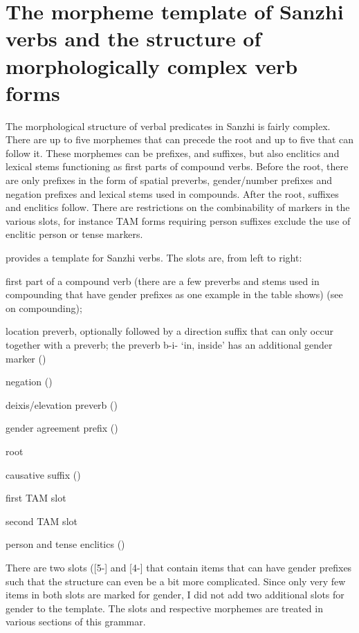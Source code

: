 
\section[The morpheme template of Sanzhi verbs]{The morpheme template of Sanzhi verbs and the structure of morphologically complex verb forms}
\label{sec:The morpheme template of Sanzhi verbs and the structure of morphologically complex verb forms}

The morphological structure of verbal predicates in Sanzhi is fairly complex. There are up to five morphemes that can precede the root and up to five that can follow it. These morphemes can be prefixes, and suffixes, but also enclitics and lexical stems functioning as first parts of compound verbs. Before the root, there are only prefixes in the form of spatial preverbs, gender/number prefixes and negation prefixes and lexical stems used in compounds. After the root, suffixes and enclitics follow. There are restrictions on the combinability of markers in the various slots, for instance TAM forms requiring person suffixes exclude the use of enclitic person or tense markers.

 provides a template for Sanzhi verbs. The slots are, from left to right:
%
\begin{description}[leftmargin=*]
	\item[5-]	first part of a compound verb (there are a few preverbs and stems used in compounding that have gender prefixes as one example in the table shows) (see  on compounding); 
	\item[4-]	location preverb, optionally followed by a direction suffix that can only occur together with a preverb; the preverb b-i- `in, inside' has an additional gender marker ()
	\item[3-]	negation ()
	\item[2-]	deixis/elevation preverb ()
	\item[1-]	gender agreement prefix ()
	\item[0]	root
	\item[-1]	causative suffix ()
	\item[-2]	first TAM slot 
	\item[-3]	second TAM slot 
	\item[-4]	person and tense enclitics ()
\end{description}
%
There are two slots ([5-] and [4-] that contain items that can have gender prefixes such that the structure can even be a bit more complicated. Since only very few items in both slots are marked for gender, I did not add two additional slots for gender to the template. The slots and respective morphemes are treated in various sections of this grammar.
%

